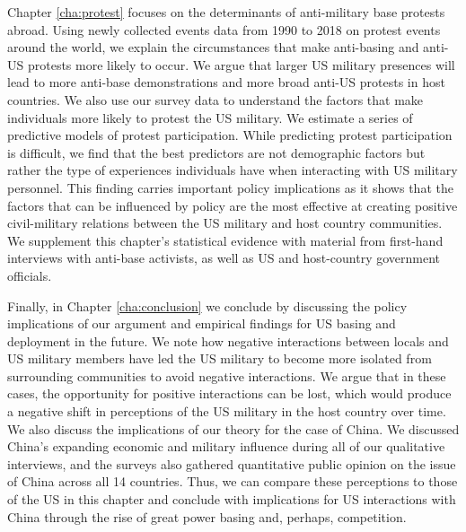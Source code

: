 Chapter \ref{cha:protest} focuses on the determinants of anti-military base protests abroad. Using newly collected events data from 1990 to 2018 on protest events around the world, we explain the circumstances that make anti-basing and anti-US protests more likely to occur. We argue that larger US military presences will lead to more anti-base demonstrations and more broad anti-US protests in host countries. We also use our survey data to understand the factors that make individuals more likely to protest the US military. We estimate a series of predictive models of protest participation. While predicting protest participation is difficult, we find that the best predictors are not demographic factors but rather the type of experiences individuals have when interacting with US military personnel. This finding carries important policy implications as it shows that the factors that can be influenced by policy are the most effective at creating positive civil-military relations between the US military and host country communities. We supplement this chapter's statistical evidence with material from first-hand interviews with anti-base activists, as well as US and host-country government officials. 

Finally, in Chapter \ref{cha:conclusion} we conclude by discussing the policy implications of our argument and empirical findings for US basing and deployment in the future. We note how negative interactions between locals and US military members have led the US military to become more isolated from surrounding communities to avoid negative interactions. We argue that in these cases, the opportunity for positive interactions can be lost, which would produce a negative shift in perceptions of the US military in the host country over time. We also discuss the implications of our theory for the case of China. We discussed China's expanding economic and military influence during all of our qualitative interviews, and the surveys also gathered quantitative public opinion on the issue of China across all 14 countries. Thus, we can compare these perceptions to those of the US in this chapter and conclude with implications for US interactions with China through the rise of great power basing and, perhaps, competition.
